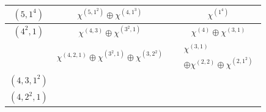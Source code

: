 \begin{figure}[H]
\begin{tabular}{|c|c|c|c|}
		$(5,1^4)$ & $\chi^{(5,1^2)}\oplus \chi^{(4,1^3)}$ &\makecell{$\substack{  ( \chi^{(2,1)} \boxtimes \chi^{(3)})\\ \oplus (\chi^{(1^3)}\boxtimes \chi^{(3)})\oplus (\chi^{(2,1)} \boxtimes \chi^{(2,1)})}$}&
		$\chi^{(1^4)}$ \\ \hline
		$(4^2,1)$ & $\chi^{(4,3)}\oplus \chi^{(3^2,1)}$ &\makecell{$\substack{   (\chi^{(3)} \boxtimes \chi^{(2,1)})\\ \oplus (\chi^{(2,1)}\boxtimes \chi^{(2,1)})\oplus(\chi^{(3)}\boxtimes \chi^{(1^3)})}$}&$\chi^{(4)}\oplus \chi^{(3,1)}$
		\\ \hline
		\makecell{$(4,3,2)$ }& $\chi^{(4,2,1)}\oplus \chi^{(3^2,1)}\oplus \chi^{(3,2^2)}$ &\makecell{$\substack{  (\chi^{(3)}\boxtimes \chi^{(3)})\oplus (\chi^{(2,1)}\boxtimes \chi^{(3)}) \\ \oplus (\chi^{(3)} \boxtimes \chi^{(2,1)})  \oplus 2(\chi^{(2,1)}\boxtimes \chi^{(2,1)}) \\ \oplus(\chi^{(1^3)}\boxtimes \chi^{(2,1)}) \oplus ( \chi^{(2,1)}\boxtimes \chi^{(1^3)})}$}&
		$\substack{\chi^{(3,1)} \\ \oplus \chi^{(2,2)}\oplus \chi^{(2,1^2)}}$\\ \hline
		$(4,3,1^2)$ & \makecell{$\substack{ \chi^{(4,3)}\oplus \chi^{(4,2,1)} \\ \oplus \chi^{(3^2,1)}\oplus \chi^{(3,2,1^2)}}$} &
		\makecell{$\substack{  (\chi^{(2,1)}\boxtimes \chi^{(3)})\oplus (\chi^{(1^3)}\boxtimes \chi^{(3)})\\ \oplus 2(\chi^{(3)} \boxtimes \chi^{(2,1)})\oplus 3(\chi^{(2,1)}\boxtimes \chi^{(2,1)})\\
				\oplus(\chi^{(1^3)}\boxtimes \chi^{(2,1)}) \oplus ( \chi^{(3)}\boxtimes \chi^{(1^3)})\\ \oplus ( \chi^{(2,1)}\boxtimes \chi^{(1^3)})}$}
		&
		\makecell{$\substack{\chi^{(4)}\oplus 2\chi^{(3,1)} \\ \oplus  \chi^{(2,2)}\oplus \chi^{(2,1^2)}}$ }\\ \hline
		$(4,2^2,1)$ & \makecell{$\substack{ \chi^{(4,2,1)}\oplus \chi^{(4,1^3)} \\ \oplus \chi^{(3,2^2)}\oplus \chi^{(3,2,1^2)}}$ } &
		\makecell{$\substack{  (\chi^{(3)}\boxtimes \chi^{(3)}) \oplus 2 (\chi^{(2,1)}\boxtimes \chi^{(3)})\\ \oplus (\chi^{(1^3)}\boxtimes \chi^{(3)}) \oplus (\chi^{(3)} \boxtimes \chi^{(2,1)})\\ \oplus 3(\chi^{(2,1)}\boxtimes \chi^{(2,1)})
				\oplus2(\chi^{(1^3)}\boxtimes \chi^{(2,1)}) \\ \oplus ( \chi^{(2,1)}\boxtimes \chi^{(1^3)})\oplus ( \chi^{(1^3)}\boxtimes \chi^{(1^3)})}$}

\end{tabular}
\end{figure}
